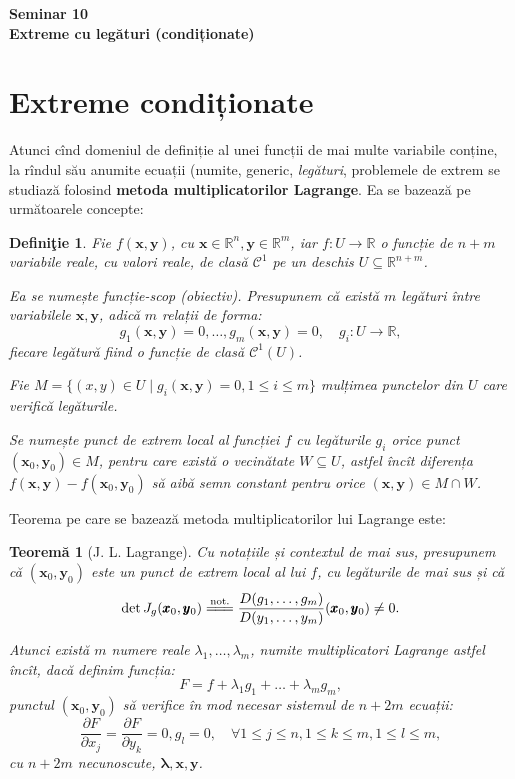 \documentclass[11pt,a4paper]{article}
\newcommand\kal{\mathcal}
\newcommand\seq{\subseteq}
\newcommand\RR{\mathbb{R}}
\theoremstyle{dotless}
\newtheorem{theorem}{Teorem\u{a}}[section]
\theoremstyle{dotlessdr}
\newtheorem{definition}{Defini\c{t}ie}[section]
\begin{document}
\begin{center}
  {\large\textbf{
      Seminar 10 \\
      Extreme cu legături (condiționate)
    }}
\end{center}

\vspace{1cm}

\section{Extreme condiționate}
\label{sec:extreme-cond}

Atunci cînd domeniul de definiție al unei funcții de mai multe variabile conține,
la rîndul său anumite ecuații (numite, generic, \emph{legături}, problemele de
extrem se studiază folosind \textbf{metoda multiplicatorilor Lagrange}. Ea se
bazează pe următoarele concepte:

\begin{definition}\label{def:fc-scop}
  Fie $f(\pmb{x}, \pmb{y})$, cu $\pmb{x} \in \RR^n, \pmb{y} \in \RR^m$,
  iar $f : U \to \RR$ o funcție de $n + m$ variabile reale, cu valori reale, de
  clasă $\kal{C}^1$ pe un deschis $U \seq \RR^{n+m}$.

  Ea se numește \emph{funcție-scop (obiectiv)}. Presupunem că există $m$
  legături între variabilele $\pmb{x}, \pmb{y}$, adică $m$ relații de forma:
  \[
    g_1(\pmb{x}, \pmb{y}) = 0, \dots, g_m(\pmb{x}, \pmb{y}) = 0, \quad %
    g_i : U \to \RR,
  \]
  fiecare legătură fiind o funcție de clasă $\kal{C}^1(U)$.

  Fie $M = \{(x, y) \in U \mid g_i(\pmb{x}, \pmb{y}) = 0, 1 \leq i \leq m\}$
  mulțimea punctelor din $U$ care verifică legăturile.

  Se numește \emph{punct de extrem local al funcției $f$ cu legăturile $g_i$}
  orice punct $(\pmb{x}_0, \pmb{y}_0) \in M$, pentru care există o vecinătate
  $W \seq U$, astfel încît diferența $f(\pmb{x}, \pmb{y}) - f(\pmb{x}_0, \pmb{y}_0)$
  să aibă semn constant pentru orice $(\pmb{x}, \pmb{y}) \in M \cap W$.
\end{definition}

Teorema pe care se bazează metoda multiplicatorilor lui Lagrange este:

\begin{theorem}[J. L. Lagrange]\label{thm:lagr-mult}
  Cu notațiile și contextul de mai sus, presupunem că $(\pmb{x}_0, \pmb{y}_0)$
  este un punct de extrem local al lui $f$, cu legăturile de mai sus și că
  \[
    \det J_g(\pmb{x}_0, \pmb{y}_0) \stackrel{\text{not.}}{=\joinrel=\joinrel=} %
    \frac{D(g_1, \dots, g_m)}{D(y_1, \dots, y_m)} (\pmb{x}_0, \pmb{y}_0) \neq 0.
  \]

  Atunci există $m$ numere reale $\lambda_1, \dots, \lambda_m$, numite
  \emph{multiplicatori Lagrange} astfel încît, dacă definim funcția:
  \[
    F = f + \lambda_1 g_1 + \dots + \lambda_m g_m,
  \]
  punctul $(\pmb{x}_0, \pmb{y}_0)$ să verifice în mod necesar sistemul de
  $n + 2m$ ecuații:
  \[
    \frac{\partial F}{\partial x_j} = \frac{\partial F}{\partial y_k} = 0, %
    g_l = 0, \quad \forall 1 \leq j \leq n, 1 \leq k \leq m, 1 \leq l \leq m,
  \]
  cu $n + 2m$ necunoscute, $\pmb{\lambda}, \pmb{x}, \pmb{y}$.
\end{theorem}
\end{document}
